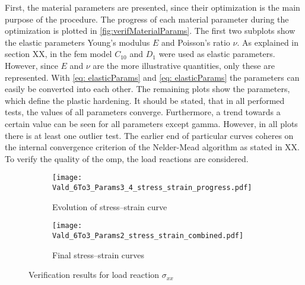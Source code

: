First, the material parameters are presented, since their optimization is the main purpose of the procedure. The progress of each material parameter during the optimization is plotted in \autoref{fig:verifMaterialParams}. The first two subplots show the elastic parameters Young's modulus $E$ and Poisson's ratio $\nu$. As explained in section XX, in the \acrshort{fem} model $C_{10}$ and $D_1$ were used as elastic parameters. However, since $E$ and $\nu$ are the more illustrative quantities, only these are represented. With \autoref{eq: elasticParams} and \ref{eq: elasticParams} the parameters can easily be converted into each other. The remaining plots show the parameters, which define the plastic hardening. It should be stated, that in all performed tests, the values of all parameters converge. Furthermore, a trend towards a certain value can be seen for all parameters except gamma. However, in all plots there is at least one outlier test. The earlier end of particular curves coheres on the internal convergence criterion of the Nelder-Mead algorithm as stated in XX.  To verify the quality of the \acrlong{omp}, the load reactions are considered. 

\begin{figure}[H]
\centering
\begin{subfigure}[t]{0.495\textwidth}
    \centering
    \texttt{[image: Vald\_6To3\_Params3\_4\_stress\_strain\_progress.pdf]}
    \caption{Evolution of stress–strain curve}
    \label{fig:verifStressStrainProgress}
\end{subfigure}
\hfill
\begin{subfigure}[t]{0.495\textwidth}
    \centering
    \texttt{[image: Vald\_6To3\_Params2\_stress\_strain\_combined.pdf]}
    \caption{Final stress–strain curves}
    \label{fig:verifStressStrainFinal}
\end{subfigure}
\caption{Verification results for load reaction $\sigma_{xx}$}
\label{fig:verifStressStrainCurves}
\end{figure}

